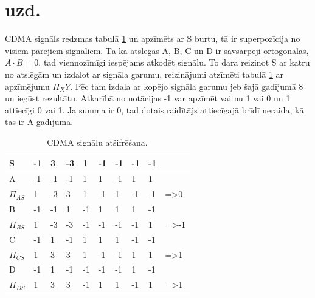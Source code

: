 \documentclass[a4paper,11pt]{article}
\begin{document}
\section{ uzd.}
CDMA signāls redzmas tabulā \ref{tabcdma} un apzīmēts ar S burtu, tā ir superpozīcija no visiem pārējiem signāliem. Tā kā atslēgas A, B, C un D ir savsarpēji ortogonālas, $A\cdot B=0$, tad viennozīmīgi iespējams atkodēt signālu. To dara reizinot S ar katru no atslēgām un izdalot ar signāla garumu, reizinājumi atzīmēti tabulā \ref{tabcdma} ar apzīmējumu $\Pi _XY$. Pēc tam izdala ar kopējo signāla garumu jeb šajā gadījumā 8 un iegūst rezultātu. Atkarībā no notācijas -1 var apzīmēt vai nu 1 vai 0 un 1 attiecīgi 0 vai 1. Ja summa ir 0, tad dotais raidītājs attiecīgajā brīdī neraida, kā tas ir A gadījumā.
\begin{table}[]
\begin{tabular}{|l|l|l|l|l|l|l|l|l|l|}
\hline
S&-1&3&-3&1&-1&-1&-1&-1&  \\ \hline
A&-1&-1&-1&1&1&-1&1&1&   \\ \hline
$\Pi_{AS}$&1&-3&3&1&-1&1&-1&-1& =>0\\ \hline
B&-1&-1&1&-1&1&1&1&-1& \\ \hline
$\Pi_{BS}$&1&-3&-3&-1&-1&-1&-1&1&=>-1 \\ \hline
C&-1&1&-1&1&1&1&-1&-1& \\ \hline
$\Pi_{CS}$&1&3&3&1&-1&-1&1&1&=>1 \\ \hline
D&-1&1&-1&-1&-1&-1&1&-1& \\ \hline
$\Pi_{DS}$&1&3&3&-1&1&1&-1&1&=>1 \\ \hline
                     
\end{tabular}
\caption{CDMA signālu atšifrēšana.}
\label{tabcdma}
\end{table}

\FloatBarrier
\end{document}

